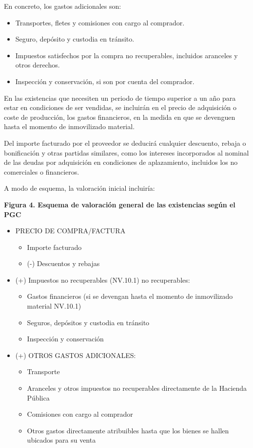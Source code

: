 \documentclass{article}
\begin{document}
En concreto, los gastos adicionales son:
\begin{itemize}
    \item Transportes, fletes y comisiones con cargo al comprador.
    \item Seguro, depósito y custodia en tránsito.
    \item Impuestos satisfechos por la compra no recuperables, incluidos aranceles y otros derechos.
    \item Inspección y conservación, si son por cuenta del comprador.
\end{itemize}

En las existencias que necesiten un periodo de tiempo superior a un año para estar en condiciones de ser vendidas, se incluirán en el precio de adquisición o coste de producción, los gastos financieros, en la medida en que se devenguen hasta el momento de inmovilizado material.

Del importe facturado por el proveedor se deducirá cualquier descuento, rebaja o bonificación y otras partidas similares, como los intereses incorporados al nominal de las deudas por adquisición en condiciones de aplazamiento, incluidos los no comerciales o financieros.

A modo de esquema, la valoración inicial incluiría:

\textbf{Figura 4. Esquema de valoración general de las existencias según el PGC}

\begin{itemize}
    \item PRECIO DE COMPRA/FACTURA
    \begin{itemize}
        \item Importe facturado
        \item (-) Descuentos y rebajas
    \end{itemize}
    \item (+) Impuestos no recuperables (NV.10.1) no recuperables:
    \begin{itemize}
        \item Gastos financieros (si se devengan hasta el momento de inmovilizado material NV.10.1)
        \item Seguros, depósitos y custodia en tránsito
        \item Inspección y conservación
    \end{itemize}
    \item (+) OTROS GASTOS ADICIONALES:
    \begin{itemize}
        \item Transporte
        \item Aranceles y otros impuestos no recuperables directamente de la Hacienda Pública
        \item Comisiones con cargo al comprador
        \item Otros gastos directamente atribuibles hasta que los bienes se hallen ubicados para su venta
    \end{itemize}
\end{itemize}
\end{document}
